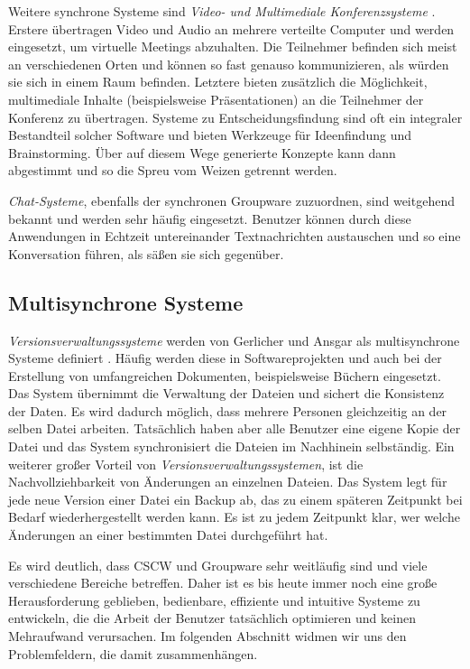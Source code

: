 Weitere synchrone Systeme sind \emph{Video- und Multimediale Konferenzsysteme} \citep{Gerlicher:2007p241}. Erstere übertragen Video und Audio an mehrere verteilte Computer und werden eingesetzt, um virtuelle Meetings abzuhalten. Die Teilnehmer befinden sich meist an verschiedenen Orten und können so fast genauso kommunizieren, als würden sie sich in einem Raum befinden. Letztere bieten zusätzlich die Möglichkeit, multimediale Inhalte (beispielsweise Präsentationen) an die Teilnehmer der Konferenz zu übertragen. Systeme zu Entscheidungsfindung sind oft ein integraler Bestandteil solcher Software und bieten Werkzeuge für Ideenfindung und Brainstorming. Über auf diesem Wege generierte Konzepte kann dann abgestimmt und so die Spreu vom Weizen getrennt werden. 

\emph{Chat-Systeme}, ebenfalls der synchronen Groupware zuzuordnen, sind weitgehend bekannt und werden sehr häufig eingesetzt. Benutzer können durch diese Anwendungen in Echtzeit untereinander Textnachrichten austauschen und so eine Konversation führen, als säßen sie sich gegenüber. 

\subsection{Multisynchrone Systeme}\label{sec:multisynchronousCSCW}

\emph{Versionsverwaltungssysteme} werden von Gerlicher und Ansgar als multisynchrone Systeme definiert \citep{Gerlicher:2007p241}. Häufig werden diese in Softwareprojekten und auch bei der Erstellung von umfangreichen Dokumenten, beispielsweise Büchern eingesetzt. Das System übernimmt die Verwaltung der Dateien und sichert die Konsistenz der Daten. Es wird dadurch möglich, dass mehrere Personen gleichzeitig an der selben Datei arbeiten. Tatsächlich haben aber alle Benutzer eine eigene Kopie der Datei und das System synchronisiert die Dateien im Nachhinein selbständig. Ein weiterer großer Vorteil von \emph{Versionsverwaltungssystemen}, ist die Nachvollziehbarkeit von Änderungen \citep{Gerlicher:2007p241} an einzelnen Dateien. Das System legt für jede neue Version einer Datei ein Backup ab, das zu einem späteren Zeitpunkt bei Bedarf wiederhergestellt werden kann. Es ist zu jedem Zeitpunkt klar, wer welche Änderungen an einer bestimmten Datei durchgeführt hat. 

\bigskip Es wird deutlich, dass CSCW und Groupware sehr weitläufig sind und viele verschiedene Bereiche betreffen. Daher ist es bis heute immer noch eine große Herausforderung geblieben, bedienbare, effiziente und intuitive Systeme zu entwickeln, die die Arbeit der Benutzer tatsächlich optimieren und keinen Mehraufwand verursachen. Im folgenden Abschnitt widmen wir uns den Problemfeldern, die damit zusammenhängen.

